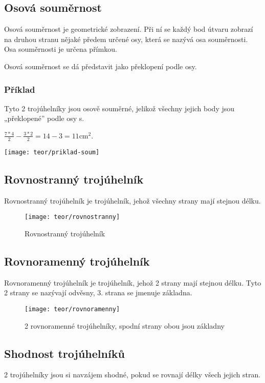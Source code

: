 \subsection{Osová souměrnost}

Osová souměrnost je geometrické zobrazení. Při ní se každý bod útvaru zobrazí na druhou stranu nějaké předem určené osy, která se nazývá osa souměrnosti. Osa souměrnosti je určena přímkou.

Osová souměrnost se dá představit jako překlopení podle osy.

\subsubsection{Příklad}
\begin{minipage}[t]{\linewidth}
    Tyto 2 trojúhelníky jsou osově souměrné, jelikož všechny jejich body jsou „překlopené” podle osy s.

    $ \frac{7*4}{2} - \frac{3*2}{2} =  14 - 3 = 11 \text{cm}^{2}$.
    \begin{center}
        \texttt{[image: teor/priklad-soum]}
    \end{center}
\end{minipage}

\subsection{Rovnostranný trojúhelník}
Rovnostranný trojúhelník je trojúhelník, jehož všechny strany mají stejnou délku.

\begin{figure}[h]
    \caption{Rovnostranný trojúhelník}
    \centering
    \texttt{[image: teor/rovnostranny]}
\end{figure}

\subsection{Rovnoramenný trojúhelník}
Rovnoramenný trojúhelník je trojúhelník, jehož 2 strany mají stejnou délku. Tyto 2 strany se nazývají odvěsny, 3. strana se jmenuje základna.

\begin{figure}[h]
    \caption{2 rovnoramenné trojúhelníky, spodní strany obou jsou základny}
    \centering
    \texttt{[image: teor/rovnoramenny]}
\end{figure}

\subsection{Shodnost trojúhelníků}
2 trojúhelníky jsou si navzájem shodné, pokud se rovnají délky všech jejich stran.

